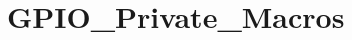 \hypertarget{group___g_p_i_o___private___macros}{\section{G\-P\-I\-O\-\_\-\-Private\-\_\-\-Macros}
\label{group___g_p_i_o___private___macros}
}

